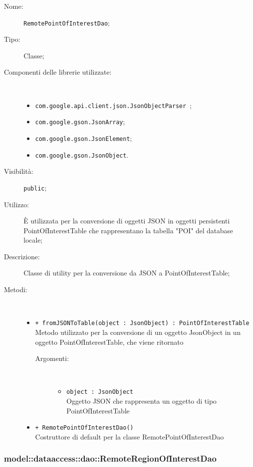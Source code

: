 \documentclass[../DefinizioneDiProdotto.tex]{subfiles}
\begin{document}
    \begin{description}
\item[Nome:] \texttt{RemotePointOfInterestDao};
\item[Tipo:] Classe;
\item[Componenti delle librerie utilizzate:] \
\begin{itemize}
\item \texttt{com.google.api.client.json.JsonObjectParser
};

\item \texttt{com.google.gson.JsonArray};

\item \texttt{com.google.gson.JsonElement};

\item \texttt{com.google.gson.JsonObject}.

\end{itemize}
\item[Visibilità:] \texttt{public};
\item[Utilizzo:] È utilizzata per la conversione di oggetti JSON in oggetti persistenti PointOfInterestTable che rappresentano la tabella "POI" del database locale;
\item[Descrizione:] Classe di utility per la conversione da JSON a PointOfInterestTable;
\item[Metodi:] \
\begin{itemize}
\item \texttt{+ fromJSONToTable(object : JsonObject) : PointOfInterestTable}\\
Metodo utilizzato per la conversione di un oggetto JsonObject in un oggetto PointOfInterestTable, che viene ritornato
 \begin{description}
\item[Argomenti:] \
\begin{itemize}
\item \texttt{object : JsonObject}\\
Oggetto JSON che rappresenta un oggetto di tipo PointOfInterestTable\end{itemize}
\end{description}
\item \texttt{+ RemotePointOfInterestDao()}\\
Costruttore di default per la classe RemotePointOfInterestDao
 \end{itemize}
\end{description}

\subsubsection{model::dataaccess::dao::RemoteRegionOfInterestDao}
\end{document}
